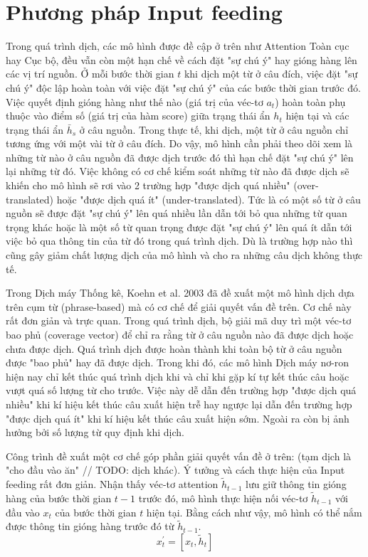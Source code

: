 \section{Phương pháp Input feeding}
Trong quá trình dịch, các mô hình được đề cập ở trên như Attention Toàn cục hay Cục bộ, đều vẫn còn một hạn chế về cách đặt "sự chú ý" hay gióng hàng lên các vị trí nguồn. Ở mỗi bước thời gian $t$ khi dịch một từ ở câu đích, việc đặt "sự chú ý" độc lập hoàn toàn với việc đặt "sự chú ý" của các bước thời gian trước đó. Việc quyết định gióng hàng như thế nào (giá trị của véc-tơ $a_t$) hoàn toàn phụ thuộc vào điểm số (giá trị của hàm score) giữa trạng thái ẩn $h_t$ hiện tại và các trạng thái ẩn $\bar{h}_s$ ở câu nguồn. Trong thực tế, khi dịch, một từ ở câu nguồn chỉ tương ứng với một vài từ ở câu đích. Do vậy, mô hình cần phải theo dõi xem là những từ nào ở câu nguồn đã được dịch trước đó thì hạn chế đặt "sự chú ý" lên lại những từ đó. Việc không có cơ chế kiểm soát những từ nào đã được dịch sẽ khiến cho mô hình sẽ rơi vào 2 trường hợp "được dịch quá nhiều" (over-translated) hoặc "được dịch quá ít" (under-translated). Tức là có một số từ ở câu nguồn sẽ được đặt "sự chú ý" lên quá nhiều lần dẫn tới bỏ qua những từ quan trọng khác hoặc là một số từ quan trọng được đặt "sự chú ý" lên quá ít dẫn tới việc bỏ qua thông tin của từ đó trong quá trình dịch. Dù là trường hợp nào thì cũng gây giảm chất lượng dịch của mô hình và cho ra những câu dịch không thực tế.

Trong Dịch máy Thống kê, Koehn et al. 2003 \cite{smtKoehn2003} đã đề xuất một mô hình dịch dựa trên cụm từ (phrase-based) mà có cơ chế để giải quyết vấn đề trên. Cơ chế này rất đơn giản và trực quan. Trong quá trình dịch, bộ giải mã duy trì một véc-tơ bao phủ (coverage vector) để chỉ ra rằng từ ở câu nguồn nào đã được dịch hoặc chưa được dịch. Quá trình dịch được hoàn thành khi toàn bộ từ ở câu nguồn được "bao phủ" hay đã được dịch. Trong khi đó, các mô hình Dịch máy nơ-ron hiện nay chỉ kết thúc quá trình dịch khi và chỉ khi gặp kí tự kết thúc câu hoặc vượt quá số lượng từ cho trước. Việc này dễ dẫn đến trường hợp "được dịch quá nhiều" khi kí hiệu kết thúc câu xuất hiện trễ hay ngược lại dẫn đến trường hợp "được dịch quá ít" khi kí hiệu kết thúc câu xuất hiện sớm. Ngoài ra còn bị ảnh hưởng bởi số lượng từ quy định khi dịch.

Công trình \cite{attentionThangLuong2015} đề xuất một cơ chế góp phần giải quyết vấn đề ở trên:  (tạm dịch là "cho đầu vào ăn" // TODO: dịch khác). Ý tưởng và cách thực hiện của Input feeding rất đơn giản. Nhận thấy véc-tơ attention $\tilde{h}_{t-1}$ lưu giữ thông tin gióng hàng của bước thời gian $t-1$ trước đó, mô hình thực hiện nối véc-tơ $\tilde{h}_{t-1}$ với đầu vào $x_t$ của bước thời gian $t$ hiện tại. Bằng cách như vậy, mô hình có thể nắm được thông tin gióng hàng trước đó từ $\tilde{h}_{t-1}$.
\begin{equation}
x^{'}_t = [x_t, \tilde{h}_t]
\end{equation}

